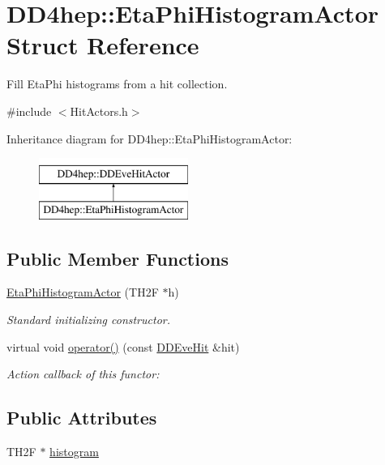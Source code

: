 \hypertarget{struct_d_d4hep_1_1_eta_phi_histogram_actor}{}\section{D\+D4hep\+:\+:Eta\+Phi\+Histogram\+Actor Struct Reference}
\label{struct_d_d4hep_1_1_eta_phi_histogram_actor}


Fill Eta\+Phi histograms from a hit collection.  




{\ttfamily \#include $<$Hit\+Actors.\+h$>$}

Inheritance diagram for D\+D4hep\+:\+:Eta\+Phi\+Histogram\+Actor\+:\begin{figure}[H]
\begin{center}
\leavevmode
\includegraphics[height=2.000000cm]{struct_d_d4hep_1_1_eta_phi_histogram_actor}
\end{center}
\end{figure}
\subsection*{Public Member Functions}
\begin{DoxyCompactItemize}
\item 
\hyperlink{struct_d_d4hep_1_1_eta_phi_histogram_actor_a241688f10ff3ad7002b0403a84a8609e}{Eta\+Phi\+Histogram\+Actor} (T\+H2F $\ast$h)
\begin{DoxyCompactList}\small\item\em Standard initializing constructor. \end{DoxyCompactList}\item 
virtual void \hyperlink{struct_d_d4hep_1_1_eta_phi_histogram_actor_ae0ab6bd1064a336f7cb3f1592a70e063}{operator()} (const \hyperlink{class_d_d4hep_1_1_d_d_eve_hit}{D\+D\+Eve\+Hit} \&hit)
\begin{DoxyCompactList}\small\item\em Action callback of this functor\+: \end{DoxyCompactList}\end{DoxyCompactItemize}
\subsection*{Public Attributes}
\begin{DoxyCompactItemize}
\item 
T\+H2F $\ast$ \hyperlink{struct_d_d4hep_1_1_eta_phi_histogram_actor_abe7d6a7db6da3c8ee5c77d718c39b2e0}{histogram}
\end{DoxyCompactItemize}


